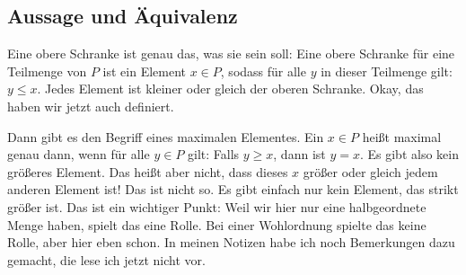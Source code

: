 \begin{math-stroke}


\end{math-stroke}

\subsection{Aussage und Äquivalenz}

\begin{spoken-clean}[00:58:40 - 01:00:40]
Eine obere Schranke ist genau das, was sie sein soll: Eine obere Schranke für eine Teilmenge von $P$ ist ein Element $x \in P$, sodass für alle $y$ in dieser Teilmenge gilt: $y \le x$. Jedes Element ist kleiner oder gleich der oberen Schranke. Okay, das haben wir jetzt auch definiert.

Dann gibt es den Begriff eines maximalen Elementes. Ein $x \in P$ heißt maximal genau dann, wenn für alle $y \in P$ gilt: Falls $y \ge x$, dann ist $y = x$. Es gibt also kein größeres Element. Das heißt aber nicht, dass dieses $x$ größer oder gleich jedem anderen Element ist! Das ist nicht so. Es gibt einfach nur kein Element, das strikt größer ist. Das ist ein wichtiger Punkt: Weil wir hier nur eine halbgeordnete Menge haben, spielt das eine Rolle. Bei einer Wohlordnung spielte das keine Rolle, aber hier eben schon. In meinen Notizen habe ich noch Bemerkungen dazu gemacht, die lese ich jetzt nicht vor.
\end{spoken-clean}

